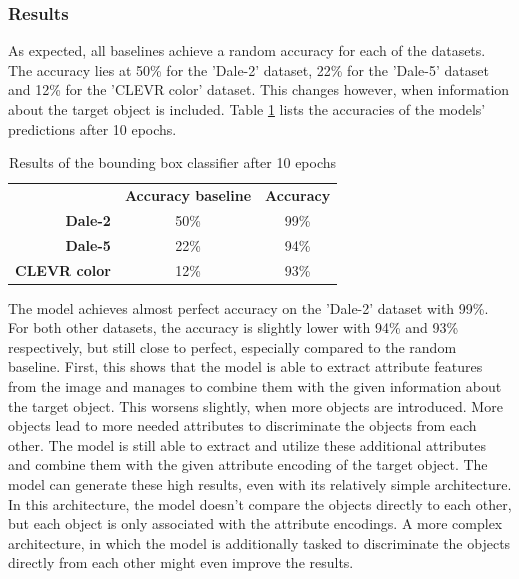 \subsubsection*{Results}
As expected, all baselines achieve a random accuracy for each of the datasets.
The accuracy lies at 50\% for the 'Dale-2' dataset, 22\% for the 'Dale-5' dataset and 12\% for the 'CLEVR color' dataset.
This changes however, when information about the target object is included.
Table \ref{tab:results_bounding_box_classifier} lists the accuracies of the models' predictions after 10 epochs.

\begin{table}[ht]
    \centering
    \begin{tabular}{rcc}
        \toprule
                             & \textbf{Accuracy baseline} & \textbf{Accuracy} \\
        \textbf{Dale-2}      & 50\%                       & 99\%              \\
        \textbf{Dale-5}      & 22\%                       & 94\%              \\
        \textbf{CLEVR color} & 12\%                       & 93\%              \\
        \bottomrule
    \end{tabular}
    \caption{Results of the bounding box classifier after 10 epochs}
    \label{tab:results_bounding_box_classifier}
\end{table}

The model achieves almost perfect accuracy on the 'Dale-2' dataset with 99\%.
For both other datasets, the accuracy is slightly lower with 94\% and 93\% respectively, but still close to perfect, especially compared to the random baseline.
First, this shows that the model is able to extract attribute features from the image and manages to combine them with the given information about the target object.
This worsens slightly, when more objects are introduced.
More objects lead to more needed attributes to discriminate the objects from each other.
The model is still able to extract and utilize these additional attributes and combine them with the given attribute encoding of the target object.
The model can generate these high results, even with its relatively simple architecture.
In this architecture, the model doesn't compare the objects directly to each other, but each object is only associated with the attribute encodings.
A more complex architecture, in which the model is additionally tasked to discriminate the objects directly from each other might even improve the results.

